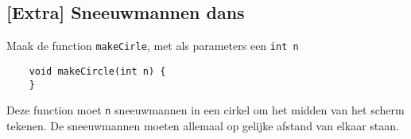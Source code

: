 \documentclass[../syllabus.tex]{subfiles}
\begin{document}
\subsection{[Extra] Sneeuwmannen dans}
Maak de function \texttt{makeCirle}, met als parameters een \texttt{int n}
\begin{lstlisting}
    void makeCircle(int n) {
    }
\end{lstlisting}
Deze function moet \texttt{n} sneeuwmannen in een cirkel om het midden van het scherm tekenen. De sneeuwmannen moeten allemaal op gelijke afstand van elkaar staan.
\end{document}

